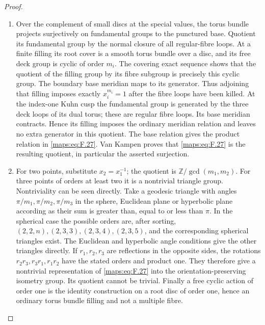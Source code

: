 \begin{proof}
\begin{enumerate}[label={$\langle1\rangle$\arabic*.}]
\item Over the complement of small discs at the special values,
the torus bundle projects surjectively on fundamental groups
to the punctured base.  Quotient its fundamental group by the
normal closure of all regular-fibre loops.  At a finite
filling its root cover is a smooth torus bundle over a disc,
and its free deck group is cyclic of order $m_i$.
The covering exact sequence shows that the quotient of the
filling group by its fibre subgroup is precisely this cyclic
group.  The boundary base meridian maps to its generator.
Thus adjoining that filling imposes exactly
$x_i^{m_i}=1$ after the fibre loops have been killed.
At the index-one Kuhn cusp the fundamental group is generated
by the three deck loops of its dual torus; these are regular
fibre loops.  Its base meridian contracts.  Hence its filling
imposes the ordinary meridian relation and leaves no extra
generator in this quotient.  The base relation gives the
product relation in \eqref{maps:eq:F.27}.  Van Kampen proves that \eqref{maps:eq:F.27} is
the resulting quotient, in particular the asserted surjection.

\item For two points, substitute $x_2=x_1^{-1}$; the quotient is
$\mathbb Z/\gcd(m_1,m_2)$.
For three points of orders at least two it is a nontrivial
triangle group.  Nontriviality can be seen directly.  Take a geodesic triangle
with angles $\pi/m_1,\pi/m_2,\pi/m_3$ in the sphere, Euclidean
plane or hyperbolic plane according as their sum is greater
than, equal to or less than $\pi$.
In the spherical case the possible orders are, after sorting,
$(2,2,n),(2,3,3),(2,3,4),(2,3,5)$, and the corresponding
spherical triangles exist.  The Euclidean and hyperbolic
angle conditions give the other triangles directly.
If $r_1,r_2,r_3$ are reflections in the opposite sides,
the rotations $r_2r_3,r_3r_1,r_1r_2$ have the stated
orders and product one.  They therefore give a nontrivial
representation of \eqref{maps:eq:F.27} into the orientation-preserving
isometry group.  Its quotient cannot be trivial.
Finally a free cyclic action of order one is the identity
construction on a root disc of order one, hence an ordinary
torus bundle filling and not a multiple fibre.

\end{enumerate}
\end{proof}




